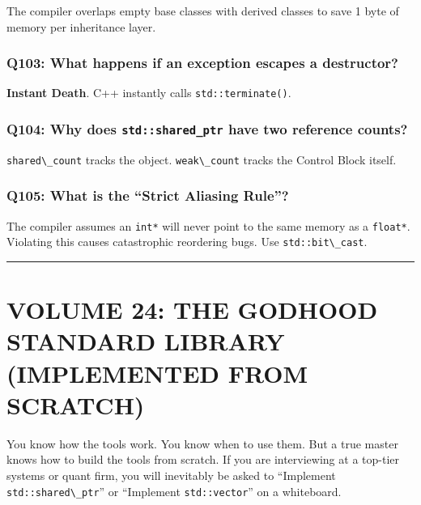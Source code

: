 The compiler overlaps empty base classes with derived classes to save 1
byte of memory per inheritance layer.

\hypertarget{q103-what-happens-if-an-exception-escapes-a-destructor}{%
\subsubsection{Q103: What happens if an exception escapes a
destructor?}\label{q103-what-happens-if-an-exception-escapes-a-destructor}}

\textbf{Instant Death}. C++ instantly calls
\passthrough{\lstinline!std::terminate()!}.

\hypertarget{q104-why-does-stdshared_ptr-have-two-reference-counts}{%
\subsubsection{\texorpdfstring{Q104: Why does \texttt{std::shared\_ptr}
have two reference
counts?}{Q104: Why does std::shared\_ptr have two reference counts?}}\label{q104-why-does-stdshared_ptr-have-two-reference-counts}}

\passthrough{\lstinline!shared\_count!} tracks the object.
\passthrough{\lstinline!weak\_count!} tracks the Control Block itself.

\hypertarget{q105-what-is-the-strict-aliasing-rule}{%
\subsubsection{Q105: What is the ``Strict Aliasing
Rule''?}\label{q105-what-is-the-strict-aliasing-rule}}

The compiler assumes an \passthrough{\lstinline!int*!} will never point
to the same memory as a \passthrough{\lstinline!float*!}. Violating this
causes catastrophic reordering bugs. Use
\passthrough{\lstinline!std::bit\_cast!}.

\begin{center}\rule{0.5\linewidth}{0.5pt}\end{center}

\hypertarget{volume-24-the-godhood-standard-library-implemented-from-scratch}{%
\section{VOLUME 24: THE GODHOOD STANDARD LIBRARY (IMPLEMENTED FROM
SCRATCH)}\label{volume-24-the-godhood-standard-library-implemented-from-scratch}}

You know how the tools work. You know when to use them. But a true
master knows how to build the tools from scratch. If you are
interviewing at a top-tier systems or quant firm, you will inevitably be
asked to ``Implement \passthrough{\lstinline!std::shared\_ptr!}'' or
``Implement \passthrough{\lstinline!std::vector!}'' on a whiteboard.


